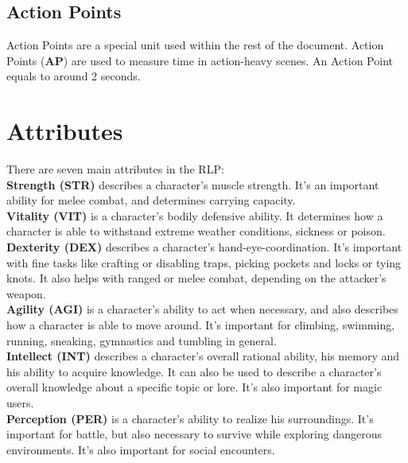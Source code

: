 \subsection{Action Points}\label{subsec:actionPoints}
Action Points are a special unit used within the rest of the document.
Action Points (\textbf{AP}) are used to measure time in action-heavy scenes.
An Action Point equals to around 2 seconds.


\section{Attributes}\label{sec:stats}
There are seven main attributes in the RLP:\\

\textbf{Strength (STR)}\label{stat:strength} describes a character's muscle strength.
It's an important ability for melee combat, and determines carrying capacity.\\


\textbf{Vitality (VIT)}\label{stat:vitality} is a character's bodily defensive ability.
It determines how a character is able to withstand extreme weather conditions, sickness or poison.\\


\textbf{Dexterity (DEX)}\label{stat:dexterity} describes a character's hand-eye-coordination.
It's important with fine tasks like crafting or disabling traps, picking pockets and locks or tying knots.
It also helps with ranged or melee combat, depending on the attacker's weapon.\\


\textbf{Agility (AGI)}\label{stat:agility} is a character's ability to act when necessary, and also describes how a character is able to move around.
It's important for climbing, swimming, running, sneaking, gymnastics and tumbling in general.\\


\textbf{Intellect (INT)}\label{stat:intellect} describes a character's overall rational ability, his memory and his ability to acquire knowledge.
It can also be used to describe a character's overall knowledge about a specific topic or lore.
It's also important for magic users.\\


\textbf{Perception (PER)}\label{stat:perception} is a character's ability to realize his surroundings.
It's important for battle, but also necessary to survive while exploring dangerous environments.
It's also important for social encounters.\\



